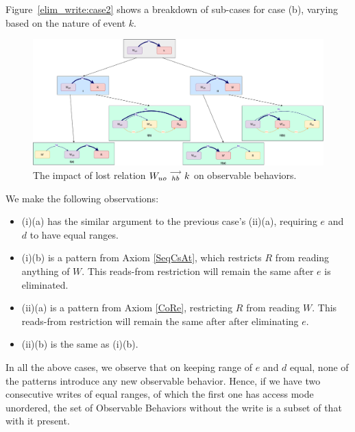     Figure~\ref{elim_write:case2} shows a breakdown of sub-cases for case (b), varying based
    on the nature of event $k$.
    \begin{figure}[H]
        \centering
        \includegraphics[scale=0.3]{5.Elimination/1.ValidEliminationCandidate/WriteElimProof/ProofParts/Part4Case2.pdf}
        \caption{The impact of lost relation $W_{uo}\stackrel{\longrightarrow}{_{hb}}k$ on observable behaviors.}
        \label{elim_write:case1}
    \end{figure}

    We make the following observations:
    \begin{itemize}
        \item (i)(a) has the similar argument to the previous case's (ii)(a), requiring $e$ and $d$ to have equal ranges.
        \item (i)(b) is a pattern from Axiom \ref{SeqCsAt}, which restricts $R$ from reading anything of $W$. This reads-from restriction will remain the same after $e$ is eliminated. 
        \item (ii)(a) is a pattern from Axiom \ref{CoRe}, restricting $R$ from reading $W$. This reads-from restriction will remain the same after after eliminating $e$.
        \item (ii)(b) is the same as (i)(b).
    \end{itemize}

    In all the above cases, we observe that on keeping range of $e$ and $d$ equal, none of the patterns introduce any new observable behavior. Hence, if we have two consecutive writes of equal ranges, of which the first one has access mode unordered, the set of Observable Behaviors without the write is a subset of that with it present. 